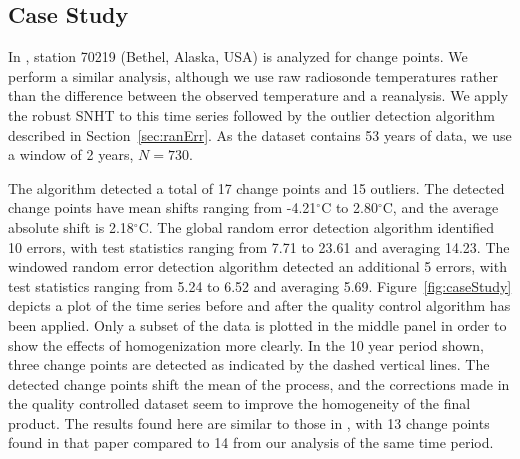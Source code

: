 \documentclass[12pt]{article}
\begin{document}
\begin{doublespacing}

\section{Case Study}

In \cite{haimberger07}, station 70219 (Bethel, Alaska, USA) is analyzed for change points.  We perform a similar analysis, although we use raw radiosonde temperatures rather than the difference between the observed temperature  and a reanalysis.  We apply the robust SNHT to this time series followed by the outlier detection algorithm described in Section~\ref{sec:ranErr}.  As the dataset contains 53 years of data, we use a window of 2 years, $N=730$.

The algorithm detected a total of 17 change points and 15 outliers.  The detected change points have mean shifts ranging from -4.21$^\circ$C to 2.80$^\circ$C, and the average absolute shift is 2.18$^\circ$C. The global random error detection algorithm identified 10 errors, with test statistics ranging from 7.71 to 23.61 and averaging 14.23.  The windowed random error detection algorithm detected an additional 5 errors, with test statistics ranging from 5.24 to 6.52 and averaging 5.69. Figure~\ref{fig:caseStudy} depicts a plot of the time series before and after the quality control algorithm has been applied.  Only a subset of the data is plotted in the middle panel in order to show the effects of homogenization more clearly.  In the 10 year period shown, three change points are detected as indicated by the dashed vertical lines.  The detected change points shift the mean of the process, and the corrections made in the quality controlled dataset seem to improve the homogeneity of the final product. The results found here are similar to those in \cite{haimberger07}, with 13 change points found in that paper compared to 14 from our analysis of the same time period.


\end{doublespacing}
\end{document}
